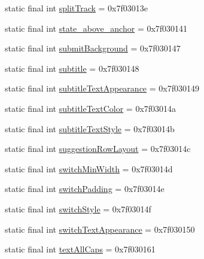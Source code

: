 \begin{DoxyCompactItemize}
\item 
static final int \mbox{\hyperlink{classcom_1_1google_1_1android_1_1gms_1_1R_1_1attr_ad151ca904161fdfed04d3047e6b17feb}{split\+Track}} = 0x7f03013e
\item 
static final int \mbox{\hyperlink{classcom_1_1google_1_1android_1_1gms_1_1R_1_1attr_a6507a9eaba573ea3d5c6cd126372ec08}{state\+\_\+above\+\_\+anchor}} = 0x7f030141
\item 
static final int \mbox{\hyperlink{classcom_1_1google_1_1android_1_1gms_1_1R_1_1attr_aa9453748d9ef66d45bf326a510bb70da}{submit\+Background}} = 0x7f030147
\item 
static final int \mbox{\hyperlink{classcom_1_1google_1_1android_1_1gms_1_1R_1_1attr_ae4e49c217da6ca9792608172ec378eb7}{subtitle}} = 0x7f030148
\item 
static final int \mbox{\hyperlink{classcom_1_1google_1_1android_1_1gms_1_1R_1_1attr_abfdabd443af79c021647703cc46bb6dc}{subtitle\+Text\+Appearance}} = 0x7f030149
\item 
static final int \mbox{\hyperlink{classcom_1_1google_1_1android_1_1gms_1_1R_1_1attr_aea1812bbffa96749e7cc208fb7699fbb}{subtitle\+Text\+Color}} = 0x7f03014a
\item 
static final int \mbox{\hyperlink{classcom_1_1google_1_1android_1_1gms_1_1R_1_1attr_a9186f759c68aa47917e9c4a0de3f488b}{subtitle\+Text\+Style}} = 0x7f03014b
\item 
static final int \mbox{\hyperlink{classcom_1_1google_1_1android_1_1gms_1_1R_1_1attr_a8f86ffac750c6c8c41038812d302a48d}{suggestion\+Row\+Layout}} = 0x7f03014c
\item 
static final int \mbox{\hyperlink{classcom_1_1google_1_1android_1_1gms_1_1R_1_1attr_a1fb68011880d40a6a1a859c3c96e9e78}{switch\+Min\+Width}} = 0x7f03014d
\item 
static final int \mbox{\hyperlink{classcom_1_1google_1_1android_1_1gms_1_1R_1_1attr_a0f98ab4866e1c1811af5ef8770c4b2f3}{switch\+Padding}} = 0x7f03014e
\item 
static final int \mbox{\hyperlink{classcom_1_1google_1_1android_1_1gms_1_1R_1_1attr_adac1001f8961613eb45570e7885cb66a}{switch\+Style}} = 0x7f03014f
\item 
static final int \mbox{\hyperlink{classcom_1_1google_1_1android_1_1gms_1_1R_1_1attr_a6aaebf8ae6f190a77e7457388db9a440}{switch\+Text\+Appearance}} = 0x7f030150
\item 
static final int \mbox{\hyperlink{classcom_1_1google_1_1android_1_1gms_1_1R_1_1attr_a088a5133f0381e9a2d54afc177cf2b26}{text\+All\+Caps}} = 0x7f030161

\end{DoxyCompactItemize}

